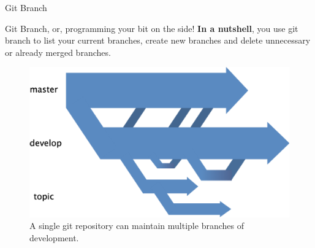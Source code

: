 \begin{frame}{Git Branch}
    \begin{block}{Git Branch, or, programming your bit on the side!}
    \textbf{In a nutshell}, you use git branch to list your current branches, create new branches and delete unnecessary or already merged branches. 
    \begin{figure}[ht]
        \centering
        \includegraphics[width=0.40\linewidth]{img/branching.png}
        \caption{A single git repository can maintain multiple branches of development.}
    \end{figure}
    \end{block}
    \pause
\end{frame}
